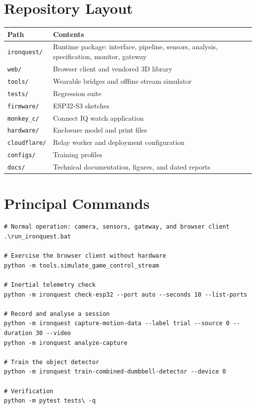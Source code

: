\documentclass[11pt,a4paper]{article}
\newcommand{\code}[1]{\texttt{\small #1}}
\begin{document}
\section{Repository Layout}

\begin{table}[H]
\centering
\small
\begin{tabularx}{\textwidth}{@{}L{3.4cm} Y@{}}
\toprule
\textbf{Path} & \textbf{Contents} \\
\midrule
\code{ironquest/} & Runtime package: interface, pipeline, sensors, analysis, specification, monitor, gateway \\
\code{web/} & Browser client and vendored 3D library \\
\code{tools/} & Wearable bridges and offline stream simulator \\
\code{tests/} & Regression suite \\
\code{firmware/} & ESP32-S3 sketches \\
\code{monkey\_c/} & Connect IQ watch application \\
\code{hardware/} & Enclosure model and print files \\
\code{cloudflare/} & Relay worker and deployment configuration \\
\code{configs/} & Training profiles \\
\code{docs/} & Technical documentation, figures, and dated reports \\
\bottomrule
\end{tabularx}
\end{table}

\section{Principal Commands}

\begin{lstlisting}
# Normal operation: camera, sensors, gateway, and browser client
.\run_ironquest.bat

# Exercise the browser client without hardware
python -m tools.simulate_game_control_stream

# Inertial telemetry check
python -m ironquest check-esp32 --port auto --seconds 10 --list-ports

# Record and analyse a session
python -m ironquest capture-motion-data --label trial --source 0 --duration 30 --video
python -m ironquest analyze-capture

# Train the object detector
python -m ironquest train-combined-dumbbell-detector --device 0

# Verification
python -m pytest tests\ -q
\end{lstlisting}
\end{document}
